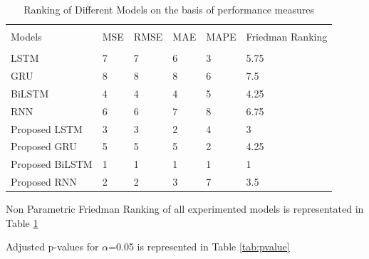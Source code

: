 \documentclass[sn-mathphys,Numbered]{sn-jnl}
\theoremstyle{thmstyleone}
\theoremstyle{thmstyletwo}
\theoremstyle{thmstylethree}
\begin{document}
\begin{table}[ht!]
\begin{tabular}{l|lllll}
\hline
\\
Models& MSE & RMSE & MAE & MAPE & Friedman Ranking\\  
\hline
\\
LSTM            & 7   & 7    & 6   & 3  & 5.75  \\
GRU             & 8   & 8    & 8   & 6  &7.5  \\
BiLSTM          & 4   & 4    & 4   & 5  &4.25  \\
RNN             & 6   & 6    & 7   & 8  &6.75  \\
Proposed LSTM   & 3   & 3    & 2   & 4  & 3  \\
Proposed GRU    & 5   & 5    & 5   & 2   &4.25 \\
Proposed BiLSTM & 1   & 1    & 1   & 1 &1   \\
Proposed RNN    & 2   & 2    & 3   & 7  &3.5  \\ \hline
\end{tabular}
\caption{Ranking of Different Models on the basis of performance measures}
\label{tab:Friedman}
\end{table}
Non Parametric Friedman Ranking of all experimented models is representated in Table \ref{tab:Friedman}

Adjusted p-values for $\alpha$=0.05 is represented in Table \ref{tab:pvalue}
\end{document}
